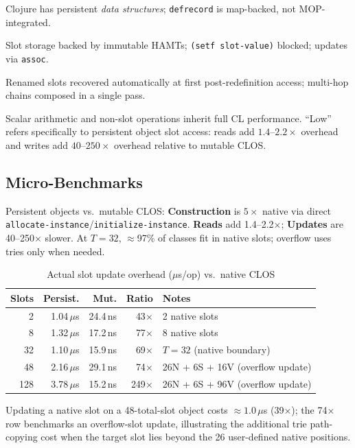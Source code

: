 \documentclass[sigconf,nonacm]{acmart}
\begin{document}
\begin{table}[htbp]
\begin{threeparttable}
\begin{tablenotes}
    \item[c] Clojure has persistent \textit{data structures}; \texttt{defrecord} is map-backed, not MOP-integrated.
    \item[d] Slot storage backed by immutable HAMTs; \texttt{(setf slot-value)} blocked; updates via \texttt{assoc}.
    \item[e] Renamed slots recovered automatically at first post-redefinition access; multi-hop chains composed in a single pass.
    \item[f] Scalar arithmetic and non-slot operations inherit full CL performance. ``Low'' refers specifically to persistent object slot access: reads add $1.4$--$2.2{\times}$ overhead and writes add $40$--$250{\times}$ overhead relative to mutable CLOS.
    \end{tablenotes}
\end{threeparttable}
\end{table}

\subsection{Micro-Benchmarks}
\label{sec:micro-bench}

Persistent objects vs.\ mutable CLOS: \textbf{Construction} is $5{\times}$ native via direct \texttt{allocate-instance}/\texttt{initialize-instance}.
\textbf{Reads} add 1.4--2.2$\times$; \textbf{Updates} are 40--250$\times$ slower.
At $T=32$, $\approx$97\% of classes fit in native slots; overflow uses tries only when needed.

\begin{table}[htbp]
\small
\caption{Actual slot update overhead ($\mu$s/op) vs.\ native CLOS}
\label{tab:micro-update}
\begin{threeparttable}
\begin{tabularx}{\columnwidth}{rrrrX}
\toprule
\textbf{Slots} & \textbf{Persist.} & \textbf{Mut.} & \textbf{Ratio} & \textbf{Notes} \\
\midrule
2   & 1.04\,$\mu$s & 24.4\,ns &  43$\times$ & 2 native slots \\
8   & 1.32\,$\mu$s & 17.2\,ns &  77$\times$ & 8 native slots \\
32  & 1.10\,$\mu$s & 15.9\,ns &  69$\times$ & $T=32$ (native boundary) \\
48  & 2.16\,$\mu$s & 29.1\,ns &  74$\times$\tnote{a} & 26N + 6S + 16V (overflow update) \\
128 & 3.78\,$\mu$s & 15.2\,ns & 249$\times$ & 26N + 6S + 96V (overflow update) \\
\bottomrule
\end{tabularx}
\begin{tablenotes}
  \footnotesize
  \item[a] Updating a native slot on a 48-total-slot object costs ${\approx}1.0\,\mu$s (39$\times$); the 74$\times$ row benchmarks an overflow-slot update, illustrating the additional trie path-copying cost when the target slot lies beyond the 26 user-defined native positions.
\end{tablenotes}
\end{threeparttable}
\end{table}
\end{document}
